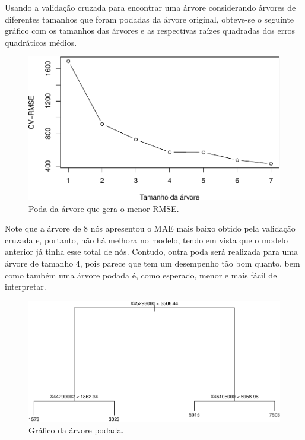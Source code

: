 \documentclass[11pt,]{article}
\begin{document}
Usando a validação cruzada para encontrar uma árvore considerando
árvores de diferentes tamanhos que foram podadas da árvore original,
obteve-se o seguinte gráfico com os tamanhos das árvores e as
respectivas raízes quadradas dos erros quadráticos médios.

\begin{figure}

{\centering \includegraphics[width=0.8\linewidth]{figs/arvore_reg_pod_CV} 

}

\caption{Poda da árvore que gera o menor RMSE.}\label{fig:arvore_reg_pod_CV}
\end{figure}

Note que a árvore de 8 nós apresentou o MAE mais baixo obtido pela
validação cruzada e, portanto, não há melhora no modelo, tendo em vista
que o modelo anterior já tinha esse total de nós. Contudo, outra poda
será realizada para uma árvore de tamanho 4, pois parece que tem um
desempenho tão bom quanto, bem como também uma árvore podada é, como
esperado, menor e mais fácil de interpretar.

\begin{figure}
\centering
\includegraphics{figs/unnamed-chunk-16.pdf}
\caption{Gráfico da árvore podada.}
\end{figure}
\end{document}

